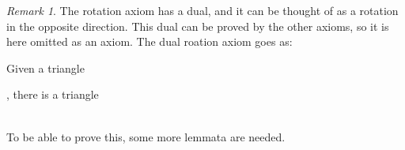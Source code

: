 \documentclass[12pt]{article}
\theoremstyle{definition}
\theoremstyle{remark}
\newtheorem*{remark}{Remark}
\begin{document}
        \begin{remark}
            The rotation axiom has a dual, and it can be thought of as a rotation in the opposite direction. This dual can be proved by the other axioms, so it is here omitted as an axiom. The dual roation axiom goes as:

            Given a triangle , there is a triangle  \\ %
            To be able to prove this, some more lemmata are needed.
        \end{remark}
\end{document}
